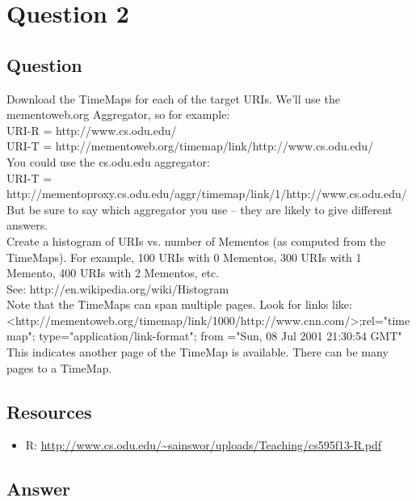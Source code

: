 \section{Question 2}

\subsection{Question}
Download the TimeMaps for each of the target URIs.  We'll use the mementoweb.org 
Aggregator, so for example:\\

URI-R = http://www.cs.odu.edu/\\

URI-T = http://mementoweb.org/timemap/link/http://www.cs.odu.edu/\\

You could use the cs.odu.edu aggregator:\\

URI-T = http://mementoproxy.cs.odu.edu/aggr/timemap/link/1/http://www.cs.odu.edu/\\

But be sure to say which aggregator you use -- they are likely to give
different answers.\\

Create a histogram of URIs vs. number of Mementos (as computed from
the TimeMaps).  For example, 100 URIs with 0 Mementos, 300 URIs
with 1 Memento, 400 URIs with 2 Mementos, etc.\\

See: http://en.wikipedia.org/wiki/Histogram\\

Note that the TimeMaps can span multiple pages.  Look for links like:\\

<http://mementoweb.org/timemap/link/1000/http://www.cnn.com/>;rel="timemap"; 
type="application/link-format"; from ="Sun, 08 Jul 2001 21:30:54 GMT"\\

This indicates another page of the TimeMap is available.  There can be 
many pages to a TimeMap.\\

\subsection{Resources}
\begin{itemize}
\item R: \url{http://www.cs.odu.edu/~sainswor/uploads/Teaching/cs595f13-R.pdf}
\end{itemize}

\subsection{Answer}

